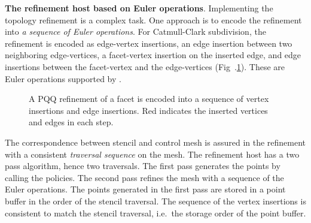 \noindent\textbf{The refinement host based on Euler operations}.
Implementing the topology refinement is a complex task. One
approach is to encode the refinement into \emph{a sequence of Euler
operations}. For Catmull-Clark subdivision, the refinement is encoded
as edge-vertex insertions, an edge insertion between two neighboring
edge-vertices, a facet-vertex insertion on the inserted edge, and 
edge insertions between the facet-vertex and the edge-vertices 
(Fig~.\ref{fig:CCRefinement}). These are Euler operations supported 
by \cgalpoly.
\begin{figure}
  \centering
  \caption{A PQQ refinement of a facet is encoded into a sequence of
  vertex insertions and edge insertions. Red indicates the inserted
  vertices and edges in each step.}
  \label{fig:CCRefinement}
\end{figure}

The correspondence between stencil and control mesh is assured in the
refinement with a consistent \emph{traversal sequence\/} on the mesh.
The refinement host has a two pass algorithm, hence two traversals.
The first pass generates the points by calling the policies. The
second pass refines the mesh with a sequence of the Euler operations.
The points generated in the first pass are stored in a point buffer in
the order of the stencil traversal. The sequence of the vertex
insertions is consistent to match the stencil traversal, i.e.\ the
storage order of the point buffer.

